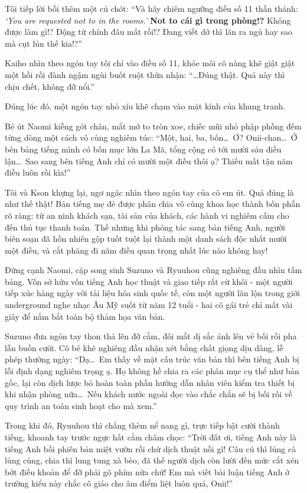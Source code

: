 \documentclass[../main.tex]{subfiles}
\begin{document}
Tôi tiếp lời bồi thêm một cú chót: ``Và hãy chiêm ngưỡng điều số 11 thần thánh: \textit{`You are requested not to in the rooms.'} \textbf{Not to cái gì trong phòng!?} Không được làm gì!? Động từ chính đâu mất rồi!? Đang viết dở thì lăn ra ngủ hay sao mà cụt lủn thế kia!?''

Kaiho nhìn theo ngón tay tôi chỉ vào điều số 11, khóe môi cô nàng khẽ giật giật một hồi rồi đành ngậm ngùi buốt ruột thừa nhận: ``\dots Đúng thật. Quả này thì chịu chết, không đỡ nổi.''

Đúng lúc đó, một ngón tay nhỏ xíu khẽ chạm vào mặt kính của khung tranh.

Bé út Naomi kiễng gót chân, mắt mở to tròn xoe, chiếc mũi nhỏ phập phồng đếm từng dòng một cách vô cùng nghiêm túc: ``Một, hai, ba, bốn\dots\ Ơ? Onii-chan\dots\ Ở bên bảng tiếng mình có bốn mục lớn La Mã, tổng cộng có tới mười sáu điều lận\dots\ Sao sang bên tiếng Anh chỉ có mười một điều thôi ạ? Thiếu mất tận năm điều luôn rồi kìa!''

Tôi và Kson khựng lại, ngơ ngác nhìn theo ngón tay của cô em út. Quả đúng là như thế thật! Bản tiếng mẹ đẻ được phân chia vô cùng khoa học thành bốn phần rõ ràng: từ an ninh khách sạn, tài sản của khách, các hành vi nghiêm cấm cho đến thủ tục thanh toán. Thế nhưng khi phóng tác sang bản tiếng Anh, người biên soạn đã hồn nhiên gộp tuốt tuột lại thành một danh sách độc nhất mười một điều, và cắt phăng đi năm điều quan trọng nhất lúc nào không hay!

Đứng cạnh Naomi, cặp song sinh Suzuno và Ryuuhou cũng nghiêng đầu nhìn tấm bảng. Vốn sở hữu vốn tiếng Anh học thuật và giao tiếp rất cừ khôi - một người tiếp xúc hàng ngày với tài liệu hóa sinh quốc tế, còn một người lăn lộn trong giới underground nghe nhạc Âu Mỹ suốt từ năm 12 tuổi - hai cô gái trẻ chỉ mất vài giây để nắm bắt toàn bộ thảm họa văn bản.

Suzuno đưa ngón tay thon thả lên đỡ cằm, đôi mắt dị sắc ánh lên vẻ bối rối pha lẫn buồn cười. Cô bé khẽ nghiêng đầu nhận xét bằng chất giọng dịu dàng, lễ phép thường ngày: ``Dạ\dots\ Em thấy về mặt cấu trúc văn bản thì bên tiếng Anh bị lỗi định dạng nghiêm trọng ạ. Họ không hề chia ra các phân mục cụ thể như bản gốc, lại còn dịch lược bỏ hoàn toàn phần hướng dẫn nhân viên kiểm tra thiết bị khi nhận phòng nữa\dots\ Nếu khách nước ngoài đọc vào chắc chắn sẽ bị bối rối về quy trình an toàn sinh hoạt cho mà xem.''

Trong khi đó, Ryuuhou thì chẳng thèm nể nang gì, trực tiếp bật cười thành tiếng, khoanh tay trước ngực hất cằm châm chọc: ``Trời đất ơi, tiếng Anh này là tiếng Anh bồi phiên bản miệt vườn rồi chứ dịch thuật nỗi gì! Câu cú thì lủng cà lủng củng, chia thì lung tung xà bèo, đã thế người dịch còn lười đến mức cắt xén bớt điều khoản để đỡ phải gõ phím nữa chứ! Em mà viết bài luận tiếng Anh ở trường kiểu này chắc cô giáo cho âm điểm liệt luôn quá, Onii!''
\end{document}

